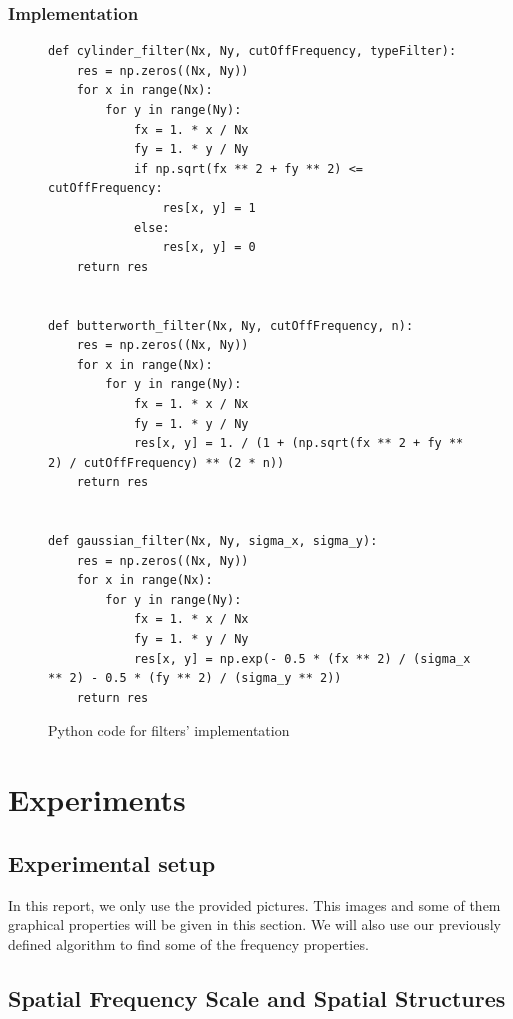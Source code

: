 \documentclass[a4paper]{article}
\begin{document}
		\subsubsection{Implementation}
\begin{figure}[ht!]
\lstset{language=Python}
\begin{lstlisting}
def cylinder_filter(Nx, Ny, cutOffFrequency, typeFilter):
    res = np.zeros((Nx, Ny))
    for x in range(Nx):
        for y in range(Ny):
            fx = 1. * x / Nx
            fy = 1. * y / Ny
            if np.sqrt(fx ** 2 + fy ** 2) <= cutOffFrequency:
                res[x, y] = 1
            else:
                res[x, y] = 0
    return res


def butterworth_filter(Nx, Ny, cutOffFrequency, n):
    res = np.zeros((Nx, Ny))
    for x in range(Nx):
        for y in range(Ny):
            fx = 1. * x / Nx
            fy = 1. * y / Ny
            res[x, y] = 1. / (1 + (np.sqrt(fx ** 2 + fy ** 2) / cutOffFrequency) ** (2 * n))
    return res


def gaussian_filter(Nx, Ny, sigma_x, sigma_y):
    res = np.zeros((Nx, Ny))
    for x in range(Nx):
        for y in range(Ny):
            fx = 1. * x / Nx
            fy = 1. * y / Ny
            res[x, y] = np.exp(- 0.5 * (fx ** 2) / (sigma_x ** 2) - 0.5 * (fy ** 2) / (sigma_y ** 2))
    return res
\end{lstlisting}
\caption{Python code for filters' implementation}
\label{filters_code}
\end{figure}

















\section{Experiments}
	\subsection{Experimental setup}
	In this report, we only use the provided pictures.   This images and some of them graphical properties will be given in this section.   We will also use our previously defined algorithm to find some of the frequency properties.
    \subsection{Spatial Frequency Scale and Spatial Structures}
    
\end{document}
